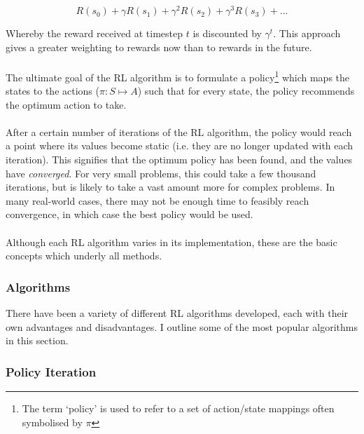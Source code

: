 \documentclass[a4paper,oneside]{report}
\begin{document}
\begin{equation*} 
	R(s_0) + \gamma R(s_1) + \gamma^2 R(s_2) + \gamma^3 R(s_3) + ...
\end{equation*}

Whereby the reward received at timestep $t$ is discounted by $\gamma^t$. This approach gives a greater weighting to rewards now than to rewards in the future.

\paragraph{} The ultimate goal of the RL algorithm is to formulate a policy\footnote{The term `policy' is used to refer to a set of action/state mappings often symbolised by $\pi$} which maps the states to the actions ($\pi: S \mapsto A$) such that for every state, the policy recommends the optimum action to take.

\paragraph{} After a certain number of iterations of the RL algorithm, the policy would reach a point where its values become static (i.e. they are no longer updated with each iteration). This signifies that the optimum policy has been found, and the values have \emph{converged}. For very small problems, this could take a few thousand iterations, but is likely to take a vast amount more for complex problems. In many real-world cases, there may not be enough time to feasibly reach convergence, in which case the best policy would be used.

\paragraph{} Although each RL algorithm varies in its implementation, these are the basic concepts which underly all methods. 

\subsubsection{Algorithms}

There have been a variety of different RL algorithms developed, each with their own advantages and disadvantages. I outline some of the most popular algorithms in this section. 

\subsubsection{Policy Iteration}
\end{document}
